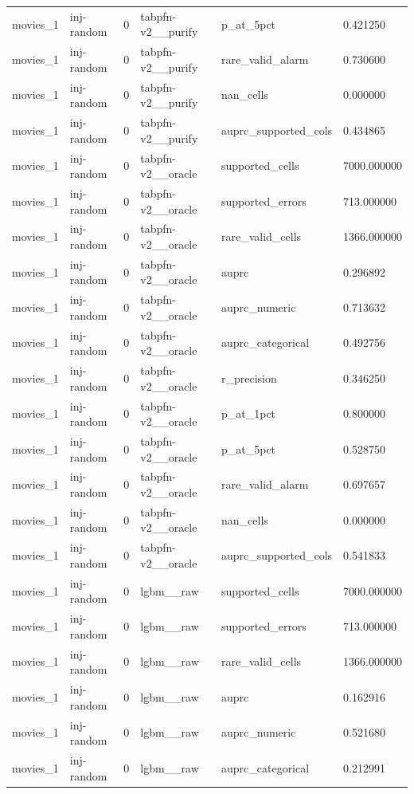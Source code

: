 \begin{tabular}{llllll}
movies\_1 & inj-random & 0 & tabpfn-v2\_\_purify & p\_at\_5pct & 0.421250 \\
movies\_1 & inj-random & 0 & tabpfn-v2\_\_purify & rare\_valid\_alarm & 0.730600 \\
movies\_1 & inj-random & 0 & tabpfn-v2\_\_purify & nan\_cells & 0.000000 \\
movies\_1 & inj-random & 0 & tabpfn-v2\_\_purify & auprc\_supported\_cols & 0.434865 \\
movies\_1 & inj-random & 0 & tabpfn-v2\_\_oracle & supported\_cells & 7000.000000 \\
movies\_1 & inj-random & 0 & tabpfn-v2\_\_oracle & supported\_errors & 713.000000 \\
movies\_1 & inj-random & 0 & tabpfn-v2\_\_oracle & rare\_valid\_cells & 1366.000000 \\
movies\_1 & inj-random & 0 & tabpfn-v2\_\_oracle & auprc & 0.296892 \\
movies\_1 & inj-random & 0 & tabpfn-v2\_\_oracle & auprc\_numeric & 0.713632 \\
movies\_1 & inj-random & 0 & tabpfn-v2\_\_oracle & auprc\_categorical & 0.492756 \\
movies\_1 & inj-random & 0 & tabpfn-v2\_\_oracle & r\_precision & 0.346250 \\
movies\_1 & inj-random & 0 & tabpfn-v2\_\_oracle & p\_at\_1pct & 0.800000 \\
movies\_1 & inj-random & 0 & tabpfn-v2\_\_oracle & p\_at\_5pct & 0.528750 \\
movies\_1 & inj-random & 0 & tabpfn-v2\_\_oracle & rare\_valid\_alarm & 0.697657 \\
movies\_1 & inj-random & 0 & tabpfn-v2\_\_oracle & nan\_cells & 0.000000 \\
movies\_1 & inj-random & 0 & tabpfn-v2\_\_oracle & auprc\_supported\_cols & 0.541833 \\
movies\_1 & inj-random & 0 & lgbm\_\_raw & supported\_cells & 7000.000000 \\
movies\_1 & inj-random & 0 & lgbm\_\_raw & supported\_errors & 713.000000 \\
movies\_1 & inj-random & 0 & lgbm\_\_raw & rare\_valid\_cells & 1366.000000 \\
movies\_1 & inj-random & 0 & lgbm\_\_raw & auprc & 0.162916 \\
movies\_1 & inj-random & 0 & lgbm\_\_raw & auprc\_numeric & 0.521680 \\
movies\_1 & inj-random & 0 & lgbm\_\_raw & auprc\_categorical & 0.212991 \\

\end{tabular}
